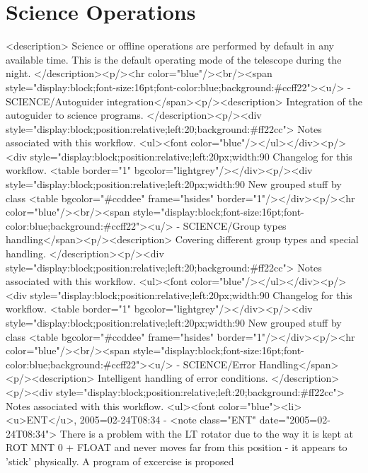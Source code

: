     \section{Science Operations}

    <description>
      Science or offline operations are performed by default in any available time. This is the default
      operating mode of the telescope during the night.
    </description><p/><hr color="blue"/><br/><span style="display:block;font-size:16pt;font-color:blue;background:#ccff22"><u/> -    SCIENCE/Autoguider integration</span><p/><description>
	Integration of the autoguider to science programs.
      </description><p/><div style="display:block;position:relative;left:20;background:#ff22cc">
      Notes associated with this workflow.
      <ul><font color="blue"/></ul></div><p/><div style="display:block;position:relative;left:20px;width:90%
      Changelog for this workflow.
      <table border="1" bgcolor="lightgrey"/></div><p/><div style="display:block;position:relative;left:20px;width:90%
     New grouped stuff by class
     <table bgcolor="#ccddee" frame="hsides" border="1"/></div><p/><hr color="blue"/><br/><span style="display:block;font-size:16pt;font-color:blue;background:#ccff22"><u/> -    SCIENCE/Group types handling</span><p/><description>
	Covering different group types and special handling.
      </description><p/><div style="display:block;position:relative;left:20;background:#ff22cc">
      Notes associated with this workflow.
      <ul><font color="blue"/></ul></div><p/><div style="display:block;position:relative;left:20px;width:90%
      Changelog for this workflow.
      <table border="1" bgcolor="lightgrey"/></div><p/><div style="display:block;position:relative;left:20px;width:90%
     New grouped stuff by class
     <table bgcolor="#ccddee" frame="hsides" border="1"/></div><p/><hr color="blue"/><br/><span style="display:block;font-size:16pt;font-color:blue;background:#ccff22"><u/> -    SCIENCE/Error Handling</span><p/><description>
		Intelligent handling of error conditions.
      </description><p/><div style="display:block;position:relative;left:20;background:#ff22cc">
      Notes associated with this workflow.
      <ul><font color="blue"><li><u>ENT</u>, 2005=02-24T08:34 -  <note class="ENT" date="2005=02-24T08:34">
		There is a problem with the LT rotator due to the way it is kept at ROT MNT 0 + FLOAT and never
		moves far from this position - it appears to 'stick' physically. A program of excercise is proposed
